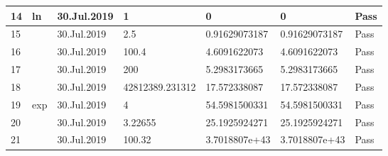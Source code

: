 \documentclass[15pt]{article}
\begin{document}
\begin{CJK*}{UTF8}{gbsn}
{\begin{table}[!htp]
\begin{tabular}{@{}|l|l|l|l|l|l|l|@{}}
14                       & ln                               & 30.Jul.2019                    & 1                          & 0                                    & 0                                  & Pass                                                                             \\ \midrule
15                       &                                  & 30.Jul.2019                    & 2.5                        & 0.91629073187                        & 0.91629073187                      & Pass                                                                             \\ \midrule
16                       &                                  & 30.Jul.2019                    & 100.4                      & 4.6091622073                         & 4.6091622073                       & Pass                                                                             \\ \midrule
17                       &                                  & 30.Jul.2019                    & 200                        & 5.2983173665                         & 5.2983173665                       & Pass                                                                             \\ \midrule
18                       &                                  & 30.Jul.2019                    & 42812389.231312            & 17.572338087                         & 17.572338087                       & Pass                                                                             \\ \midrule
19                       & exp                              & 30.Jul.2019                    & 4                          & 54.5981500331                        & 54.5981500331                      & Pass                                                                             \\ \midrule
20                       &                                  & 30.Jul.2019                    & 3.22655                    & 25.1925924271                        & 25.1925924271                      & Pass                                                                             \\ \midrule
21                       &                                  & 30.Jul.2019                    & 100.32                     & 3.7018807e+43                        & 3.7018807e+43                      & Pass                                                                             \\ \midrule

\end{tabular}
\end{table}}
\end{CJK*}
\end{document}
